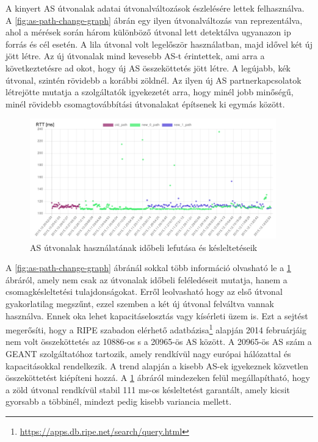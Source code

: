 A kinyert AS útvonalak adatai útvonalváltozások észlelésére lettek felhasználva. A \ref{fig:as-path-change-graph} ábrán egy ilyen útvonalváltozás van reprezentálva, ahol a mérések során három különböző útvonal lett detektálva ugyanazon ip forrás és cél esetén. A lila útvonal volt legelőször használatban, majd idővel két új jött létre. Az új útvonalak mind kevesebb AS-t érintettek, ami arra a következtetésre ad okot, hogy új AS összeköttetés jött létre. A legújabb, kék útvonal, szintén rövidebb a korábbi zöldnél. Az ilyen új AS partnerkapcsolatok létrejötte mutatja a szolgáltatók igyekezetét arra, hogy minél jobb minőségű, minél rövidebb csomagtovábbítási útvonalakat építsenek ki egymás között. 

\begin{figure}[!ht]
	\centering
	\includegraphics[width=0.95\textwidth, keepaspectratio]{figures/as-path-change-diagram.PNG}
	\caption{AS útvonalak használatának időbeli lefutása és késleltetéseik}
	\label{fig:as-path-change-diagram}
\end{figure}

A \ref{fig:as-path-change-graph} ábránál sokkal több információ olvasható le a \ref{fig:as-path-change-diagram} ábráról, amely nem csak az útvonalak időbeli feléledéseit mutatja, hanem a csomagkésleltetési tulajdonságokat. Erről leolvasható hogy az első útvonal gyakorlatilag megszűnt, ezzel szemben a két új útvonal felváltva vannak használva. Ennek oka lehet kapacitáselosztás vagy kísérleti üzem is. Ezt a sejtést megerősíti, hogy a RIPE szabadon elérhető adatbázisa\footnote{\url{https://apps.db.ripe.net/search/query.html}} alapján 2014 februárjáig nem volt összeköttetés az 10886-os s a 20965-ös AS között. A 20965-ös AS szám a GEANT szolgáltatóhoz tartozik, amely rendkívül nagy európai hálózattal és kapacitásokkal rendelkezik. A trend alapján a kisebb AS-ek igyekeznek közvetlen összeköttetést kiépíteni hozzá. A \ref{fig:as-path-change-diagram} ábráról mindezeken felül megállapítható, hogy a zöld útvonal rendkívül stabil 111 ms-os késleltetést garantált, amely kicsit gyorsabb a többinél, mindezt pedig kisebb variancia mellett.

